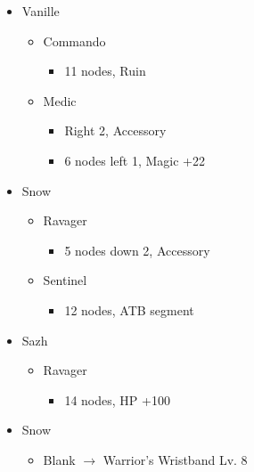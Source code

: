 \begin{menu}
	\begin{itemize}
		\crystarium
		\begin{itemize}
			\item Vanille
			      \begin{itemize}
				      \item Commando
				            \begin{itemize}
					            \item 11 nodes, Ruin
				            \end{itemize}
				      \item Medic
				            \begin{itemize}
					            \item Right 2, Accessory
					            \item 6 nodes left 1, Magic +22
				            \end{itemize}
			      \end{itemize}
			\item Snow
			      \begin{itemize}
				      \item Ravager
				            \begin{itemize}
					            \item 5 nodes down 2, Accessory
				            \end{itemize}
				      \item Sentinel
				            \begin{itemize}
					            \item 12 nodes, ATB segment
				            \end{itemize}
			      \end{itemize}
			\item Sazh
			      \begin{itemize}
				      \item Ravager
				            \begin{itemize}
					            \item 14 nodes,  HP +100
				            \end{itemize}
			      \end{itemize}
		\end{itemize}
		\equip
		\begin{itemize}
			\item Snow
			      \begin{itemize}
				      \item Blank $\rightarrow$ Warrior's Wristband Lv. 8

\end{itemize}
\end{itemize}
\end{itemize}
\end{menu}
